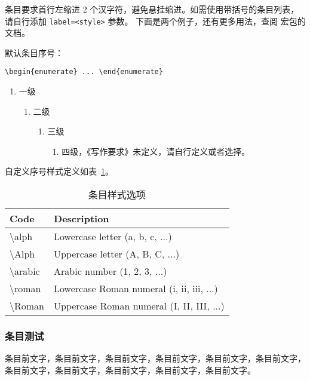 条目要求首行左缩进 2 个汉字符，避免悬挂缩进。如需使用带括号的条目列表，请自行添加 \verb|label=<style>| 参数。
下面是两个例子，还有更多用法，查阅  宏包的文档。

默认条目序号：

\verb|\begin{enumerate} ... \end{enumerate}|

\begin{enumerate}
  \item 一级
  \begin{enumerate}
    \item 二级
    \begin{enumerate}
      \item 三级
      \begin{enumerate}
        \item 四级，《写作要求》未定义，请自行定义或者选择。
      \end{enumerate}
    \end{enumerate}
  \end{enumerate}
\end{enumerate}

自定义序号样式定义如表~\ref{tab:enum-style}。

\begin{table}[h]
  \centering
  \caption{条目样式选项}
  \label{tab:enum-style}
  \begin{tabular}{@{}ll@{}}
  \toprule
  \textbf{Code}          & \textbf{Description}                      \\ \midrule
  \textbackslash{}alph   & Lowercase letter (a, b, c, ...)           \\
  \textbackslash{}Alph   & Uppercase letter (A, B, C, ...)           \\
  \textbackslash{}arabic & Arabic number (1, 2, 3, ...)              \\
  \textbackslash{}roman  & Lowercase Roman numeral (i, ii, iii, ...) \\
  \textbackslash{}Roman  & Uppercase Roman numeral (I, II, III, ...) \\ \bottomrule
  \end{tabular}
\end{table}

\subsubsection{条目测试}


条目前文字，条目前文字，条目前文字，条目前文字，条目前文字，条目前文字，条目前文字，条目前文字，条目前文字，条目前文字，条目前文字。

